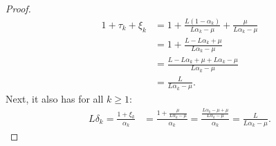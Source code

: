 \documentclass[12pt]{article}
\begin{document}
\begin{proof}
            \begin{align*}
                1 + \tau_k + \xi_k &=
                1 + \frac{L(1 - \alpha_k)}{L \alpha_k - \mu}
                + \frac{\mu}{L \alpha_k - \mu}
                \\
                &=
                1 + \frac{L - L \alpha_k + \mu}{L\alpha_k - \mu}
                \\
                &=
                \frac{L - L \alpha_k + \mu + L \alpha_k - \mu}{L\alpha_k - \mu}
                \\
                &= \frac{L}{L\alpha_k - \mu}.
            \end{align*}
            Next, it also has for all $k \ge 1$:
            \begin{align*}
                L\delta_k = \frac{1 + \xi_k}{\alpha_k}
                &=
                \frac{1 + \frac{\mu}{L\alpha_k - \mu}}{\alpha_k}
                =
                \frac{\frac{L\alpha_k - \mu + \mu}{L \alpha_k - \mu}}{\alpha_k}
                =
                \frac{L}{L\alpha_k - \mu}.
            \end{align*}

        \end{proof}
\end{document}
